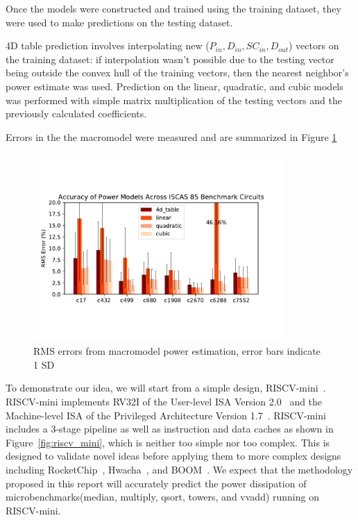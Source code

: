 Once the models were constructed and trained using the training dataset, they were used to make predictions on the testing dataset.

4D table prediction involves interpolating new ($P_{in}, D_{in}, SC_{in}, D_{out}$) vectors on the training dataset: if interpolation wasn't possible due to the testing vector being outside the convex hull of the training vectors, then the nearest neighbor's power estimate was used. Prediction on the linear, quadratic, and cubic models was performed with simple matrix multiplication of the testing vectors and the previously calculated coefficients.

Errors in the the macromodel were measured and are summarized in Figure \ref{fig:rms_error}

\begin{figure}
	\centering
	\includegraphics[clip, trim=0.5cm 2.5cm 0.5cm 2.5cm,width=0.85\textwidth,height=\textheight,keepaspectratio]{images/macromodel_rms_errors.pdf}
	\caption{RMS errors from macromodel power estimation, error bars indicate 1 SD}
	\label{fig:rms_error}
\end{figure}


To demonstrate our idea, we will start from a simple design, RISCV-mini~\cite{riscv-mini}.
RISCV-mini implements RV32I of the User-level ISA Version 2.0~\cite{riscv-user-2.0} and
the Machine-level ISA of the Privileged Architecture Version 1.7~\cite{riscv-prev-1.7}.
RISCV-mini includes a 3-stage pipeline as well as instruction and data caches as shown
in Figure~\ref{fig:riscv_mini}, which is neither too simple nor too complex. This is designed
to validate novel ideas before applying them to more complex designs including
RocketChip~\cite{RocketChip}, Hwacha~\cite{Hwacha}, and BOOM~\cite{BOOM}.
We expect that the methodology proposed in this report will accurately predict
the power dissipation of microbenchmarks(median, multiply, qsort, towers, and vvadd) running on RISCV-mini.

